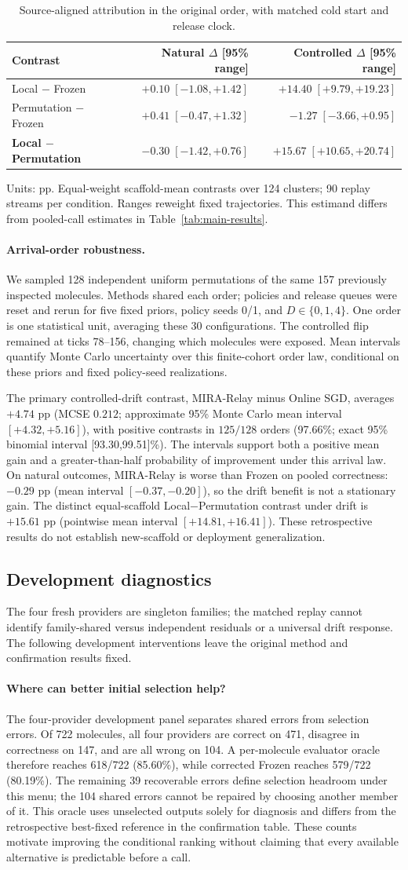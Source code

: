 \documentclass[sigconf,anonymous]{aamas}
\makeatletter
\newcommand{\MiraTableFont}{\fontsize{9}{11}\selectfont}
\newcommand{\tnote}[1]{{\fontsize{8.5}{10}\selectfont\raggedright\par\vspace{3pt}#1\par}}
\newcommand{\MiraCreditCaption}{Source-aligned attribution in the original order, with matched cold start and release clock.}
\newcommand{\MiraCreditLabels}{\label{tab:credit-ablation}}
\newcommand{\MiraCreditBody}{%
\begingroup\centering\MiraTableFont\setlength{\tabcolsep}{13pt}\renewcommand{\arraystretch}{1.10}
\begin{tabular}{@{}lrr@{}}
\toprule
Contrast & Natural $\Delta$ [95\% range] & Controlled $\Delta$ [95\% range] \\
\midrule
Local $-$ Frozen & $+0.10\;[-1.08,+1.42]$ & $+14.40\;[+9.79,+19.23]$ \\
Permutation $-$ Frozen & $+0.41\;[-0.47,+1.32]$ & $-1.27\;[-3.66,+0.95]$ \\
\textbf{Local $-$ Permutation} & $-0.30\;[-1.42,+0.76]$ & $+15.67\;[+10.65,+20.74]$ \\
\bottomrule
\end{tabular}\par
\tnote{Units: pp. Equal-weight scaffold-mean contrasts over 124 clusters; 90 replay streams per condition. Ranges reweight fixed trajectories. This estimand differs from pooled-call estimates in Table~\ref{tab:main-results}.}
\endgroup}
\makeatother
\begin{document}
\begin{table}[t]
\caption{\MiraCreditCaption}
\MiraCreditLabels
\MiraCreditBody
\end{table}

\paragraph{Arrival-order robustness.}
We sampled 128 independent uniform permutations of the same 157 previously
inspected molecules. Methods shared each order; policies and release queues were
reset and rerun for five fixed priors, policy seeds 0/1, and $D\in\{0,1,4\}$.
One order is one statistical unit, averaging these 30 configurations. The controlled
flip remained at ticks 78--156, changing which molecules were exposed.
Mean intervals quantify Monte Carlo uncertainty over this finite-cohort order law,
conditional on these priors and fixed policy-seed realizations.



The primary controlled-drift contrast, MIRA-Relay minus Online SGD, averages
$+4.74$ pp (MCSE $0.212$; approximate 95\% Monte Carlo mean interval $[+4.32,+5.16]$),
with positive contrasts in $125/128$ orders (97.66\%; exact 95\% binomial
interval [93.30,99.51]\%). The intervals support both a positive mean gain and a greater-than-half probability of improvement under this arrival law.
On natural outcomes, MIRA-Relay is worse than Frozen on pooled correctness:
$-0.29$ pp (mean interval $[-0.37,-0.20]$), so the drift benefit is not a stationary gain.
The distinct equal-scaffold Local$-$Permutation contrast under drift is
$+15.61$ pp (pointwise mean interval $[+14.81,+16.41]$).
These retrospective results do not establish new-scaffold or deployment generalization.

\subsection{Development diagnostics}
The four fresh providers are singleton families; the matched replay cannot identify family-shared versus independent residuals or a universal drift response. The following development interventions leave the original method and confirmation results fixed.

\paragraph{Where can better initial selection help?}
The four-provider development panel separates shared errors from selection errors. Of 722 molecules, all four providers are correct on 471, disagree in correctness on 147, and are all wrong on 104. A per-molecule evaluator oracle therefore reaches 618/722 (85.60\%), while corrected Frozen reaches 579/722 (80.19\%). The remaining 39 recoverable errors define selection headroom under this menu; the 104 shared errors cannot be repaired by choosing another member of it. This oracle uses unselected outputs solely for diagnosis and differs from the retrospective best-fixed reference in the confirmation table. These counts motivate improving the conditional ranking without claiming that every available alternative is predictable before a call.
\end{document}
